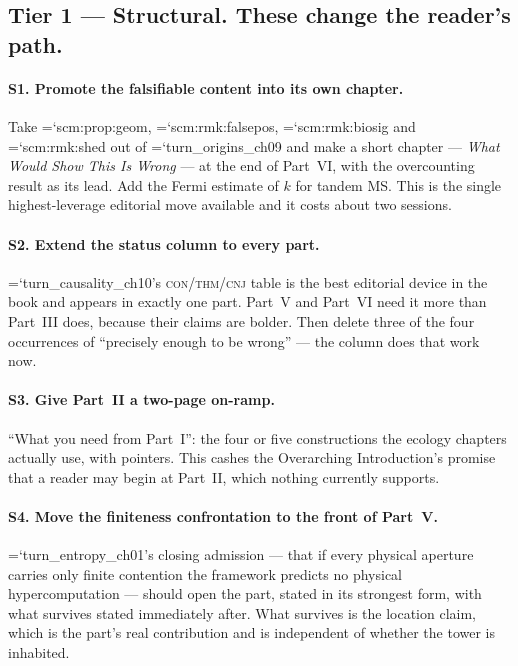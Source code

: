 \documentclass[11pt,letterpaper]{article}
\newcommand{\loc}[1]{{\small\ttfamily\color{accent}\hyphenchar\font=`\-\relax #1}}
\begin{document}
\subsection*{Tier 1 --- Structural. These change the reader's path.}

\paragraph{S1. Promote the falsifiable content into its own chapter.}
Take \loc{scm:prop:geom}, \loc{scm:rmk:falsepos}, \loc{scm:rmk:biosig}
and \loc{scm:rmk:shed} out of \loc{turn\_origins\_ch09} and make a
short chapter --- \emph{What Would Show This Is Wrong} --- at the end of
Part~VI, with the overcounting result as its lead. Add the Fermi
estimate of $k$ for tandem MS. This is the single highest-leverage
editorial move available and it costs about two sessions.

\paragraph{S2. Extend the status column to every part.}
\loc{turn\_causality\_ch10}'s \textsc{con}/\textsc{thm}/\textsc{cnj}
table is the best editorial device in the book and appears in exactly
one part. Part~V and Part~VI need it more than Part~III does, because
their claims are bolder. Then delete three of the four occurrences of
``precisely enough to be wrong'' --- the column does that work now.

\paragraph{S3. Give Part~II a two-page on-ramp.}
``What you need from Part~I'': the four or five constructions the
ecology chapters actually use, with pointers. This cashes the
Overarching Introduction's promise that a reader may begin at Part~II,
which nothing currently supports.

\paragraph{S4. Move the finiteness confrontation to the front of
Part~V.} \loc{turn\_entropy\_ch01}'s closing admission --- that if every
physical aperture carries only finite contention the framework predicts
no physical hypercomputation --- should open the part, stated in its
strongest form, with what survives stated immediately after. What
survives is the location claim, which is the part's real contribution
and is independent of whether the tower is inhabited.
\end{document}
